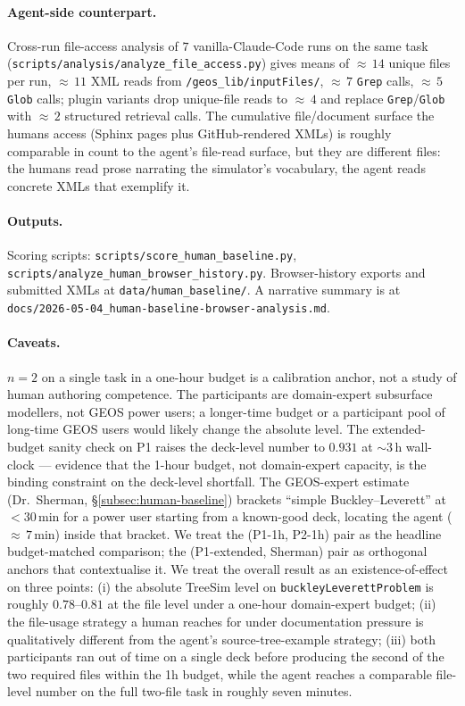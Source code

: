 \documentclass{article}
\begin{document}
\paragraph{Agent-side counterpart.} Cross-run file-access analysis of $7$ vanilla-Claude-Code runs on the same task (\texttt{scripts/analysis/analyze\_file\_access.py}) gives means of ${\approx}\,14$ unique files per run, ${\approx}\,11$ XML reads from \texttt{/geos\_lib/inputFiles/}, ${\approx}\,7$ \texttt{Grep} calls, ${\approx}\,5$ \texttt{Glob} calls; plugin variants drop unique-file reads to ${\approx}\,4$ and replace \texttt{Grep}/\texttt{Glob} with ${\approx}\,2$ structured retrieval calls. The cumulative file/document surface the humans access (Sphinx pages plus GitHub-rendered XMLs) is roughly comparable in count to the agent's file-read surface, but they are different files: the humans read prose narrating the simulator's vocabulary, the agent reads concrete XMLs that exemplify it.

\paragraph{Outputs.} Scoring scripts: \texttt{scripts/score\_human\_baseline.py}, \texttt{scripts/analyze\_human\_browser\_history.py}. Browser-history exports and submitted XMLs at \texttt{data/human\_baseline/}. A narrative summary is at \texttt{docs/2026-05-04\_human-baseline-browser-analysis.md}.

\paragraph{Caveats.} $n=2$ on a single task in a one-hour budget is a calibration anchor, not a study of human authoring competence. The participants are domain-expert subsurface modellers, not GEOS power users; a longer-time budget or a participant pool of long-time GEOS users would likely change the absolute level. The extended-budget sanity check on P1 raises the deck-level number to $0.931$ at $\sim\!3\,$h wall-clock --- evidence that the 1-hour budget, not domain-expert capacity, is the binding constraint on the deck-level shortfall. The GEOS-expert estimate (Dr.~Sherman, \S\ref{subsec:human-baseline}) brackets ``simple Buckley--Leverett'' at ${<}30\,$min for a power user starting from a known-good deck, locating the agent (${\approx}\,7\,$min) inside that bracket. We treat the (P1-1h, P2-1h) pair as the headline budget-matched comparison; the (P1-extended, Sherman) pair as orthogonal anchors that contextualise it. We treat the overall result as an existence-of-effect on three points: (i) the absolute TreeSim level on \texttt{buckleyLeverettProblem} is roughly $0.78$--$0.81$ at the file level under a one-hour domain-expert budget; (ii) the file-usage strategy a human reaches for under documentation pressure is qualitatively different from the agent's source-tree-example strategy; (iii) both participants ran out of time on a single deck before producing the second of the two required files within the 1h budget, while the agent reaches a comparable file-level number on the full two-file task in roughly seven minutes.
\end{document}
